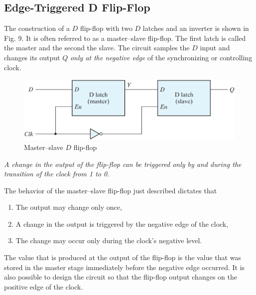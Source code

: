 \subsection{Edge-Triggered D Flip-Flop}
\label{subsec:edge-trig-d-flip-flop}

The construction of a $D$ flip-flop with two $D$ latches and an inverter is shown in Fig. 9. It is often referred to as a master–slave flip-flop. The first latch is called the master and the second the slave. The circuit samples the $D$ input and changes its output $Q$ \textit{only at the negative edge} of the synchronizing or controlling clock.
\begin{figure}[H]
  \centering
  \includegraphics[width=\linewidth]{img/fig-5.9.png}
  \caption{Master–slave $D$ flip-flop}
  \label{fig:5.9}
\end{figure}
\noindent \textit{A change in the output of the flip-flop can be triggered only by and during the transition of the clock from 1 to 0}.

The behavior of the master–slave flip-flop just described dictates that
\begin{enumerate}[leftmargin=0.5cm]
  \item The output may change only once,
  \item A change in the output is triggered by the negative edge of the clock,
  \item The change may occur only during the clock's negative level.
\end{enumerate}
\noindent The value that is produced at the output of the flip-flop is the value that was stored in the master stage immediately before the negative edge occurred. It is also possible to design the circuit so that the flip-flop output changes on the positive edge of the clock.

